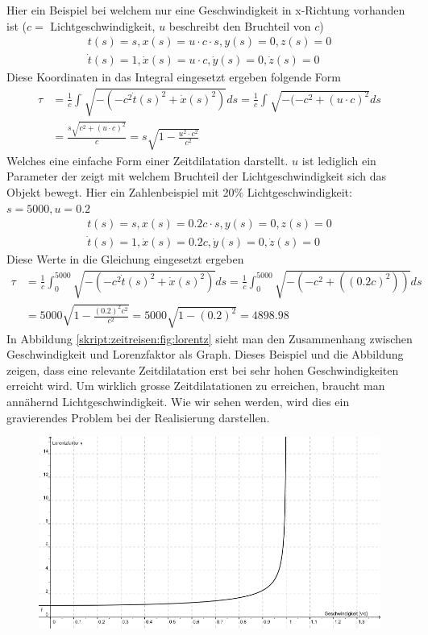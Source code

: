 \begin{refsection}
Hier ein Beispiel bei welchem nur eine Geschwindigkeit in x-Richtung vorhanden ist ($c =$ Lichtgeschwindigkeit, $u$ beschreibt den Bruchteil von $c$)
\begin{align*}
     t(s)= s, 
 	 x(s)=u\cdot c \cdot s, 
     y(s)=0, 
     z(s)=0 \\
     \dot{t}(s)=1,
     \dot{x}(s)=u\cdot c,
     \dot{y}(s)=0,
     \dot{z}(s)=0
\end{align*}
Diese Koordinaten in das Integral eingesetzt ergeben folgende Form
\begin{align*}
    \tau
    &=
    \frac{1}{c}\int_{}^{}\sqrt{-(-c^2\dot{t}(s)^2+\dot{x}(s)^2)}ds 
    =
    \frac{1}{c}\int_{}^{}\sqrt{-(-c^2 +(u\cdot c)^{2}}ds\\
    &=
    \frac{s\sqrt{c^2+(u\cdot c)^{2}}}{c} 
    =
    s\sqrt{1-\frac{u^2\cdot c^2}{c^2}}
\end{align*}
Welches eine einfache Form einer Zeitdilatation darstellt. $u$ ist lediglich ein Parameter der zeigt mit welchem Bruchteil der Lichtgeschwindigkeit sich das Objekt bewegt.
Hier ein Zahlenbeispiel mit 20\% Lichtgeschwindigkeit:
$s=5000, u=0.2$ 
\begin{align*}
    t(s)=s, 
    x(s)=0.2c \cdot s,
    y(s)=0, 
    z(s)=0 \\
    \dot{t}(s)=1,
    \dot{x}(s)=0.2c,
    \dot{y}(s)=0,
    \dot{z}(s)=0
\end{align*}
Diese Werte in die Gleichung eingesetzt ergeben
\begin{align*}
    \tau
    &=
    \frac{1}{c}\int_{0}^{5000}\sqrt{-(-c^2\dot{t}(s)^2+\dot{x}(s)^2)}ds
    =
    \frac{1}{c}\int_{0}^{5000}\sqrt{-(-c^2+((0.2c)^2))}ds\\
    &=
    5000\sqrt{1-\frac{(0.2)^2 c^2}{c^2}} 
    =
    5000\sqrt{1-(0.2)^2}
    =
    4898.98
\end{align*}
In Abbildung \ref{skript:zeitreisen:fig:lorentz}  sieht man den Zusammenhang zwischen Geschwindigkeit und Lorenzfaktor als Graph. Dieses Beispiel und die Abbildung zeigen, dass eine relevante Zeitdilatation erst bei sehr hohen Geschwindigkeiten erreicht wird. Um wirklich grosse Zeitdilatationen zu erreichen, braucht man annähernd Lichtgeschwindigkeit. Wie wir sehen werden, wird dies ein gravierendes Problem bei der Realisierung darstellen.
\begin{figure}[H]
    \centering
    \includegraphics[width=\hsize]{zeitreisen/Lorentzfaktor.jpg}

\end{figure}
\end{refsection}
